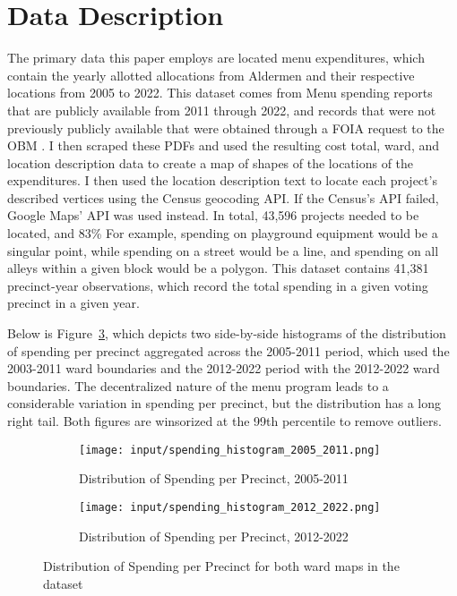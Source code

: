 \section{Data Description}\label{sec:data_description}
The primary data this paper employs are located menu expenditures, which contain the yearly allotted allocations from Aldermen and their respective locations from 2005 to 2022.
This dataset comes from Menu spending reports that are publicly available from 2011 through 2022, and records that were not previously publicly available that were obtained through a FOIA request to the OBM \cite{OBM_datasource}.  
I then scraped these PDFs and used the resulting cost total, ward, and location description data to create a map of shapes of the locations of the expenditures.
I then used the location description text to locate each project's described vertices using the Census geocoding API. 
If the Census's API failed, Google Maps' API was used instead.
In total, 43,596 projects needed to be located, and 83\% %
For example, spending on playground equipment would be a singular point, while spending on a street would be a line, and spending on all alleys within a given block would be a polygon.
This dataset contains 41,381 precinct-year observations, which record the total spending in a given voting precinct in a given year.

Below is Figure~\ref{fig:spending_hist}, which depicts two side-by-side histograms of the distribution of spending per precinct aggregated across the 2005-2011 period, which used the 2003-2011 ward boundaries and the 2012-2022 period with the 2012-2022 ward boundaries.
The decentralized nature of the menu program leads to a considerable variation in spending per precinct, but the distribution has a long right tail.
Both figures are winsorized at the 99th percentile to remove outliers.

\begin{figure}[H]
    \centering
    \begin{subfigure}[b]{0.45\textwidth} %
      \texttt{[image: input/spending\_histogram\_2005\_2011.png]}
      \caption{Distribution of Spending per Precinct, 2005-2011}
      \label{fig:sub1}
    \end{subfigure}
    \hfill %
    \begin{subfigure}[b]{0.45\textwidth}
      \texttt{[image: input/spending\_histogram\_2012\_2022.png]}
      \caption{Distribution of Spending per Precinct, 2012-2022}
      \label{fig:sub2}
    \end{subfigure}
  
    \caption{Distribution of Spending per Precinct for both ward maps in the dataset}
    \label{fig:spending_hist}
  \end{figure}

